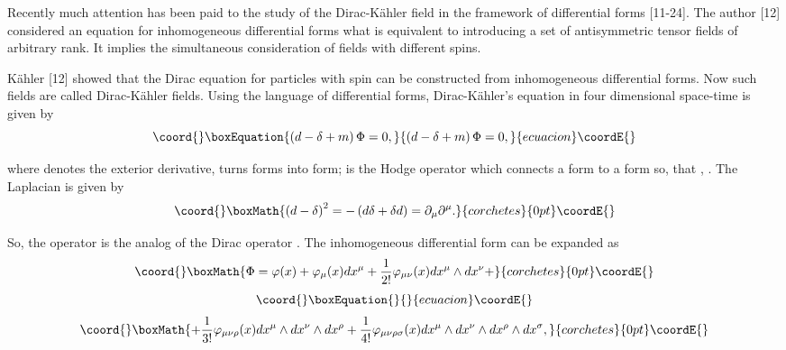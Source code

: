 \documentclass[a4paper,12pt]{article}
\begin{document}
Recently much attention has been paid to the study of the Dirac-K\"ahler
field in the framework of differential forms [11-24]. The author [12]
considered an equation for inhomogeneous differential forms what is
equivalent to introducing a set of antisymmetric tensor fields of arbitrary
rank. It implies the simultaneous consideration of fields with different
spins.

K\"ahler [12] showed that the Dirac equation for particles with spin \coordHE{}
can be constructed from inhomogeneous differential forms. Now such fields
are called Dirac-K\"ahler fields. Using the language of differential forms,
Dirac-K\"ahler's equation in four dimensional space-time is given by
\begin{equation}\coord{}\boxEquation{
\left( d-\delta +m\right) \Phi =0 ,  \label{1}
}{
\left( d-\delta +m\right) \Phi =0 ,  }{ecuacion}\coordE{}\end{equation}

where \coordHE{} denotes the exterior derivative, \coordHE{} turns \coordHE{}forms into \coordHE{}form; \myHighlight{$\star $}\coordHE{} is the Hodge
operator which connects a \coordHE{}form to a \coordHE{}form so, that
\coordHE{}, \coordHE{}. The Laplacian is given by
\[\coord{}\boxMath{
\left( d-\delta \right) ^2=-\left( d\delta +\delta d\right)
=\partial _\mu \partial ^\mu .
}{corchetes}{0pt}\coordE{}\]

So, the operator \coordHE{} is the analog of the
Dirac operator \myHighlight{$\gamma _\mu \partial _\mu $}\coordHE{}. The inhomogeneous
differential form \myHighlight{$ \Phi $}\coordHE{} can be expanded as
\[\coord{}\boxMath{
\Phi =\varphi (x)+\varphi _\mu (x)dx^\mu +\frac 1{2!}\varphi _{\mu \nu
}(x)dx^\mu \wedge dx^\nu +
}{corchetes}{0pt}\coordE{}\]
\vspace{-8mm}
\begin{equation}\coord{}\boxEquation{  \label{2}
}{  }{ecuacion}\coordE{}\end{equation}
\vspace{-8mm}
\[\coord{}\boxMath{
+\frac 1{3!}\varphi _{\mu \nu \rho }(x)dx^\mu \wedge dx^\nu \wedge
dx^\rho +\frac 1{4!}\varphi _{\mu \nu \rho \sigma }(x)dx^\mu
\wedge dx^\nu \wedge dx^\rho \wedge dx^\sigma ,
}{corchetes}{0pt}\coordE{}\]
\end{document}
